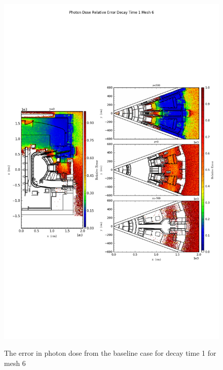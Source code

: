 \begin{figure}[ht!]
\centering
\includegraphics[trim={0cm 9cm 0cm 10cm},clip,scale=0.75]{../plots/final_model_nob4c/Photon_Dose_Relative_Error_Decay_Time_1_Mesh_6.png}
\label{fig:photons_dc1_no4bc_m6_error}
\caption{The error in photon dose from the baseline case for decay time 1 for mesh 6}
\end{figure}
